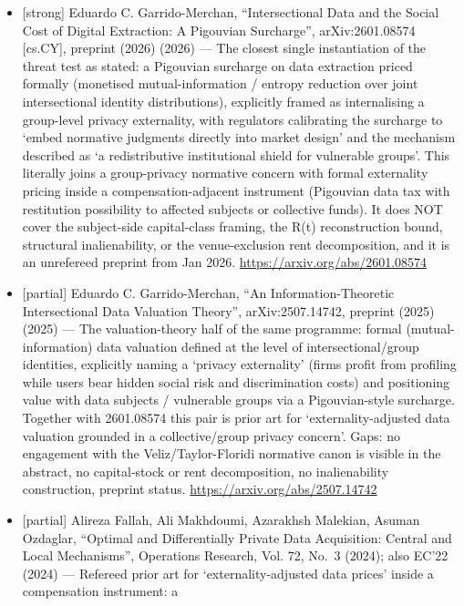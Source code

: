 \documentclass[
  11pt,
]{article}
\providecommand{\tightlist}{%
  \setlength{\itemsep}{0pt}\setlength{\parskip}{0pt}}
\begin{document}
\begin{itemize}
\tightlist
\item
  {[}strong{]} Eduardo C. Garrido-Merchan, ``Intersectional Data and the
  Social Cost of Digital Extraction: A Pigouvian Surcharge'',
  arXiv:2601.08574 {[}cs.CY{]}, preprint (2026) (2026) --- The closest
  single instantiation of the threat test as stated: a Pigouvian
  surcharge on data extraction priced formally (monetised
  mutual-information / entropy reduction over joint intersectional
  identity distributions), explicitly framed as internalising a
  group-level privacy externality, with regulators calibrating the
  surcharge to `embed normative judgments directly into market design'
  and the mechanism described as `a redistributive institutional shield
  for vulnerable groups'. This literally joins a group-privacy normative
  concern with formal externality pricing inside a compensation-adjacent
  instrument (Pigouvian data tax with restitution possibility to
  affected subjects or collective funds). It does NOT cover the
  subject-side capital-class framing, the R(t) reconstruction bound,
  structural inalienability, or the venue-exclusion rent decomposition,
  and it is an unrefereed preprint from Jan 2026.
  \url{https://arxiv.org/abs/2601.08574}
\item
  {[}partial{]} Eduardo C. Garrido-Merchan, ``An Information-Theoretic
  Intersectional Data Valuation Theory'', arXiv:2507.14742, preprint
  (2025) (2025) --- The valuation-theory half of the same programme:
  formal (mutual-information) data valuation defined at the level of
  intersectional/group identities, explicitly naming a `privacy
  externality' (firms profit from profiling while users bear hidden
  social risk and discrimination costs) and positioning value with data
  subjects / vulnerable groups via a Pigouvian-style surcharge. Together
  with 2601.08574 this pair is prior art for `externality-adjusted data
  valuation grounded in a collective/group privacy concern'. Gaps: no
  engagement with the Veliz/Taylor-Floridi normative canon is visible in
  the abstract, no capital-stock or rent decomposition, no
  inalienability construction, preprint status.
  \url{https://arxiv.org/abs/2507.14742}
\item
  {[}partial{]} Alireza Fallah, Ali Makhdoumi, Azarakhsh Malekian,
  Asuman Ozdaglar, ``Optimal and Differentially Private Data
  Acquisition: Central and Local Mechanisms'', Operations Research, Vol.
  72, No.~3 (2024); also EC'22 (2024) --- Refereed prior art for
  `externality-adjusted data prices' inside a compensation instrument: a

\end{itemize}
\end{document}
